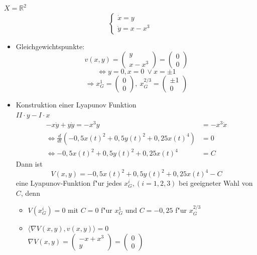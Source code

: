 \documentclass[a4paper, 13pt]{scrreprt}
\theoremstyle{definition} \newtheorem{definition}{Definition}[section]
\newenvironment{beispiel}[1][Beispiel]{\begin{trivlist}
\item[\hskip \labelsep {\bfseries #1}]}{\end{trivlist}}
\newcommand{\RR}{\mathbb{R}}
\begin{document}
\begin{beispiel} \(X = \RR^2\) 
	\[ \begin{cases} \dot{x} = y \\
			\dot{y} = x - x^3 \end {cases} 
	\]
\begin{itemize}
	\item Gleichgewichtspunkte: 
		\[v(x,y) = \left( \begin{array}{c} y \\ x-x^3 \end{array} \right) = \left(\begin{array}{c} 0 \\ 0 \end{array} \right) \]
		\[ \Leftrightarrow y = 0, x = 0 \ \lor x = \pm 1\]
		\[ \Rightarrow x_G^1 = \left(\begin{array}{c} 0 \\ 0 \end{array} \right),\  
			x_G^{2/3} = \left( \begin{array}{c} \pm 1 \\ 0 \end{array} \right ) 
		\]
	\item Konstruktion einer Lyapunov Funktion\\
		\( II \cdot y - I \cdot x \)
		\begin{align*}
			-x\dot{y} + y \dot{y} = -x^3y & = -x^3\dot{x} \\
			\Leftrightarrow \frac {d}{dt} \left( -0,5 x(t)^2 + 0,5 y(t)^2 + 0,25 x(t)^4 \right) & = 0 \\
			\Leftrightarrow -0,5 x(t)^2 + 0,5 y(t)^2 + 0,25 x(t)^4 & = C
		\end{align*}
		Dann ist 
			\[V(x,y) = -0,5 x(t)^2 + 0,5 y(t)^2 + 0,25 x(t)^4 - C\]
		eine Lyapunov-Funktion f"ur jedes \(x_G^i, (i = 1,2,3) \) bei geeigneter Wahl von \(C\), denn
		\begin{itemize}
			\item \(V(x_G^i) = 0 \) mit \( C = 0\) f"ur \( x_G^1\) und \( C = -0,25\) f"ur \(x_G^{2/3}\)
			\item \(\langle \nabla V(x,y), v(x,y) \rangle = 0\)\\
						\(\nabla V(x,y) = \left( \begin{array}{c} -x+x^3 \\ y \end{array} \right) = 
							\left( \begin{array}{c} 0 \\ 0 \end{array} \right) \)

\end{itemize}
\end{itemize}
\end{beispiel}
\end{document}
